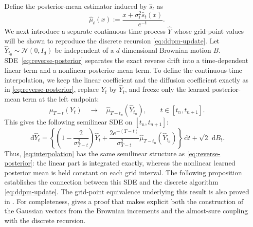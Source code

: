 \documentclass[11pt]{article}
\theoremstyle{definition}
\newcommand{\N}{\mathcal{N}}
\newcommand{\Id}{I_d}
\newcommand{\dd}{\,\mathrm{d}}
\begin{document}
Define the posterior-mean estimator induced by $\hat s_t$ as
\begin{equation}
    \hat\mu_t(x):=\frac{x+\sigma_t^2\hat s_t(x)}{e^{-t}}.
    \label{eq:muhat}
\end{equation}
We next introduce a separate continuous-time process $\hat Y$ whose
grid-point values will be shown to reproduce the discrete recursion
\eqref{eq:ddpm-update}. Let $\hat Y_{t_0}\sim\N(0,\Id)$ be independent
of a $d$-dimensional Brownian motion $B$.
SDE~\eqref{eq:reverse-posterior} separates the exact reverse
drift into a time-dependent linear term and a nonlinear
posterior-mean term. To define the continuous-time interpolation, we keep the
linear coefficient and the diffusion coefficient exactly as in
\eqref{eq:reverse-posterior}, replace $Y_t$ by $\hat Y_t$, and freeze
only the learned posterior-mean term at the left endpoint:
\[
    \mu_{T-t}(Y_t)
    \quad\longrightarrow\quad
    \hat\mu_{T-t_n}(\hat Y_{t_n}),
    \qquad t\in[t_n,t_{n+1}].
\]
This gives the following semilinear SDE on $[t_n,t_{n+1}]$:
\begin{equation}
    \dd\hat Y_t=
    \left\{
       \left(1-\frac{2}{\sigma_{T-t}^2}\right)\hat Y_t
       +\frac{2e^{-(T-t)}}{\sigma_{T-t}^2}
         \hat\mu_{T-t_n}(\hat Y_{t_n})
    \right\}\dd t+\sqrt{2}\,\dd B_t.
    \label{eq:interpolation}
\end{equation}
Thus, \eqref{eq:interpolation} has the same semilinear structure as
\eqref{eq:reverse-posterior}: the linear part is integrated exactly,
whereas the nonlinear learned posterior mean is held constant on each
grid interval. The following proposition establishes the connection
between this SDE and the discrete algorithm \eqref{eq:ddpm-update}.
The grid-point equivalence underlying this result is also proved in
\citet{huang2026optimal}. For completeness,
 gives a proof that makes explicit both
the construction of the Gaussian vectors from the Brownian increments
and the almost-sure coupling with the discrete recursion.
\end{document}
